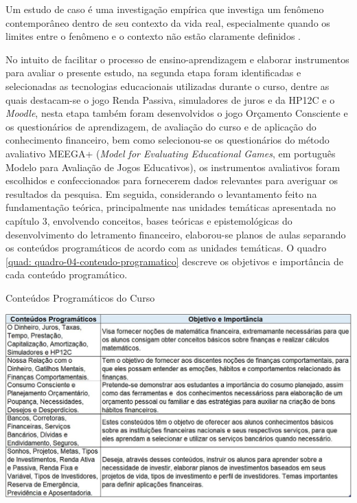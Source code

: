 \begin{citacao}
Um estudo de caso é uma investigação empírica que investiga um fenômeno contemporâneo dentro de seu contexto da vida real, especialmente quando os limites entre o fenômeno e o contexto não estão claramente definidos \cite{yin2005}.
\end{citacao}

No intuito de facilitar o processo de ensino-aprendizagem e elaborar instrumentos para avaliar o presente estudo, na segunda etapa foram identificadas e selecionadas as tecnologias educacionais utilizadas durante o curso, dentre as quais destacam-se o jogo Renda Passiva, simuladores de juros e da HP12C e o \textit{Moodle}, nesta etapa também foram desenvolvidos o jogo Orçamento Consciente e os questionários de aprendizagem, de avaliação do curso e de aplicação do conhecimento financeiro, bem como selecionou-se os questionários do método avaliativo MEEGA+ (\textit{Model for Evaluating Educational Games}, em português Modelo para Avaliação de Jogos Educativos), os instrumentos avaliativos foram escolhidos e confeccionados para fornecerem dados relevantes para averiguar os resultados da pesquisa. Em seguida, considerando o levantamento feito na fundamentação teórica, principalmente nas unidades temáticas apresentada no capítulo 3, envolvendo conceitos, bases teóricas e epistemológicas do desenvolvimento do letramento financeiro, elaborou-se planos de aulas separando os conteúdos programáticos de acordo com as unidades temáticas. O quadro \ref{quad: quadro-04-conteudo-programatico} descreve os objetivos e importância de cada conteúdo programático.

\newpage
\graphicspath{{quadros/}}
\begin{quadro}[!ht]
\centering
\begin{minipage}{1.\textwidth}
\caption{Conteúdos Programáticos do Curso}
\centering
\includegraphics[width=1.0\textwidth]{quadro-04-conteudo-programatico}
\label{quad: quadro-04-conteudo-programatico}
\end{minipage}
\end{quadro}

